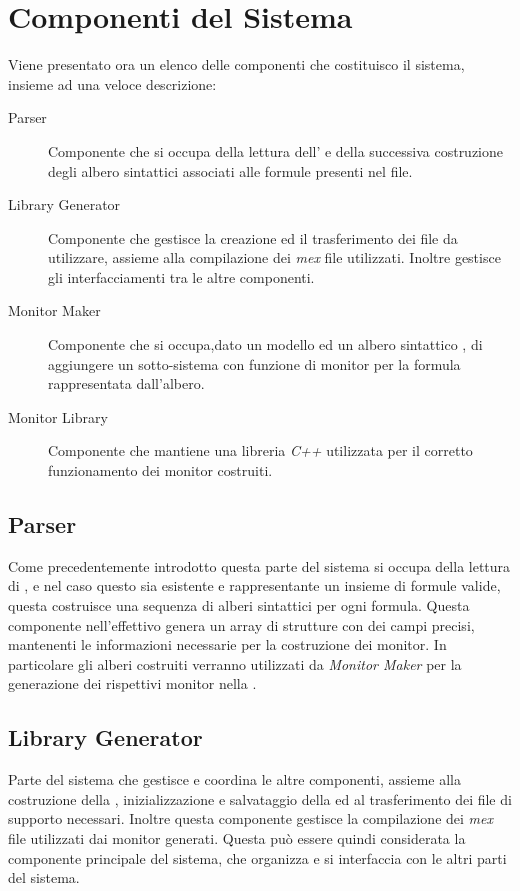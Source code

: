 \documentclass[10pt,a4paper]{article}
\newcommand{\LibGentx}{{Library Generator}}
\newcommand{\MonMakertx}{{Monitor Maker}}
\newcommand{\Parsertx}{{Parser}}
\newcommand{\MonLibrtx}{{Monitor Library}}
\newcommand{\MonMaker}{\emph{\MonMakertx}}
\begin{document}
	\newpage
	\section{Componenti del Sistema}
	Viene presentato ora un elenco delle componenti che costituisco il sistema, insieme ad una veloce descrizione:
	\begin{description}
		\item[\Parsertx{}] Componente che si occupa della lettura dell' \InputFile{} e della successiva costruzione degli albero sintattici associati alle formule presenti nel file. 

		\item[\LibGentx{}]
		Componente che gestisce la creazione ed il trasferimento dei file da utilizzare, assieme alla compilazione dei \emph{mex} file utilizzati. Inoltre gestisce gli interfacciamenti tra le altre componenti.

		
		\item[\MonMakertx]
		 Componente che si occupa,dato un modello \Simulink{} ed un albero sintattico \BLTL{},  di aggiungere un sotto-sistema con funzione di monitor per la formula rappresentata dall'albero.

		\item[\MonLibrtx{}]
		 Componente che mantiene una libreria \emph{C++} utilizzata per il corretto funzionamento dei monitor costruiti.
	\end{description}


	\subsection*{\Parsertx}
	Come precedentemente introdotto questa parte del sistema si occupa della lettura di \InputFile{}, e nel caso questo sia esistente e rappresentante un insieme di formule valide, questa costruisce una sequenza di alberi sintattici per ogni formula. Questa componente nell'effettivo  genera un array di strutture \Matlab{} con dei campi precisi, mantenenti le informazioni necessarie per la costruzione dei monitor.
	In particolare gli alberi costruiti verranno utilizzati da \MonMaker{} per la generazione dei rispettivi monitor nella \OutputLibrary. 
	
	\subsection*{\LibGentx}
	Parte del sistema che gestisce e coordina le altre componenti, assieme alla costruzione della \OutputDir{}, inizializzazione e salvataggio della \OutputLibrary{} ed al trasferimento dei file di supporto necessari. Inoltre questa componente gestisce la compilazione dei \emph{mex} file utilizzati dai monitor generati. Questa può essere quindi considerata la componente principale del sistema, che organizza e si interfaccia con le altri parti del sistema.   
	
\end{document}
